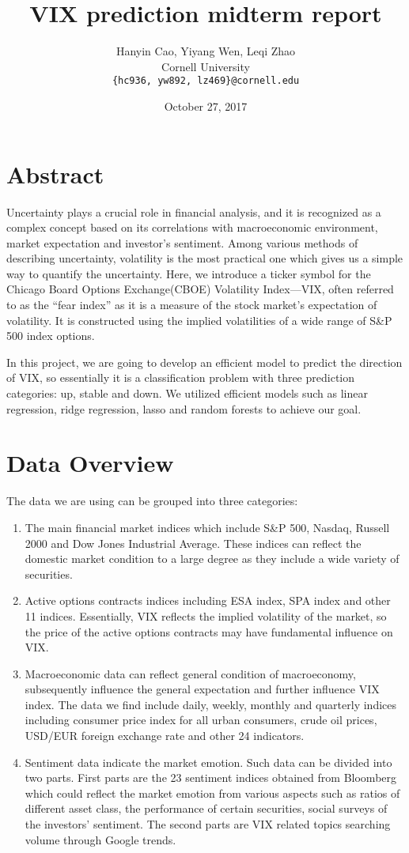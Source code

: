 \documentclass{article}
\title{VIX prediction midterm report}
\author{
  Hanyin Cao, Yiyang Wen, Leqi Zhao \\
  Cornell University \\
  \texttt{\{hc936, yw892, lz469\}@cornell.edu} \\
}
\date{October 27, 2017}
\begin{document}
\maketitle

\section*{Abstract}
Uncertainty plays a crucial role in financial analysis, and it is recognized as a complex concept based on its correlations with macroeconomic environment, market expectation and investor's sentiment. Among various methods of describing uncertainty, volatility is the most practical one which gives us a simple way to quantify the uncertainty. Here, we introduce a ticker symbol for the Chicago Board Options Exchange(CBOE) Volatility Index—VIX, often referred to as the “fear index” as it is a measure of the stock market’s expectation of volatility. It is constructed using the implied volatilities of a wide range of S\&P 500 index options.

In this project, we are going to develop an efficient model to predict the direction of VIX, so essentially it is a classification problem with three prediction categories: up, stable and down. We utilized efficient models such as linear regression, ridge regression, lasso and random forests to achieve our goal. 

\section*{Data Overview}
The data we are using can be grouped into three categories:\par
\begin{enumerate}[a]
    \itemsep0em
    \item The main financial market indices which include S\&P 500, Nasdaq, Russell 2000 and Dow Jones Industrial Average. These indices can reflect the domestic market condition to a large degree as they include a wide variety of securities.
    \item Active options contracts indices including ESA index, SPA index and other 11 indices. Essentially, VIX reflects the implied volatility of the market, so the price of the active options contracts may have fundamental influence on VIX.
    \item Macroeconomic data can reflect general condition of macroeconomy, subsequently influence the general expectation and further influence VIX index. The data we find include daily, weekly, monthly and quarterly indices including consumer price index for all urban consumers, crude oil prices, USD/EUR foreign exchange rate and other 24 indicators. 
    \item Sentiment data indicate the market emotion. Such data can be divided into two parts. First parts are the 23 sentiment indices obtained from Bloomberg which could reflect the market emotion from various aspects such as ratios of different asset class, the performance of certain securities, social surveys of the investors’ sentiment. The second parts are VIX related topics searching volume through Google trends. 
    
\end{enumerate}
\end{document}
